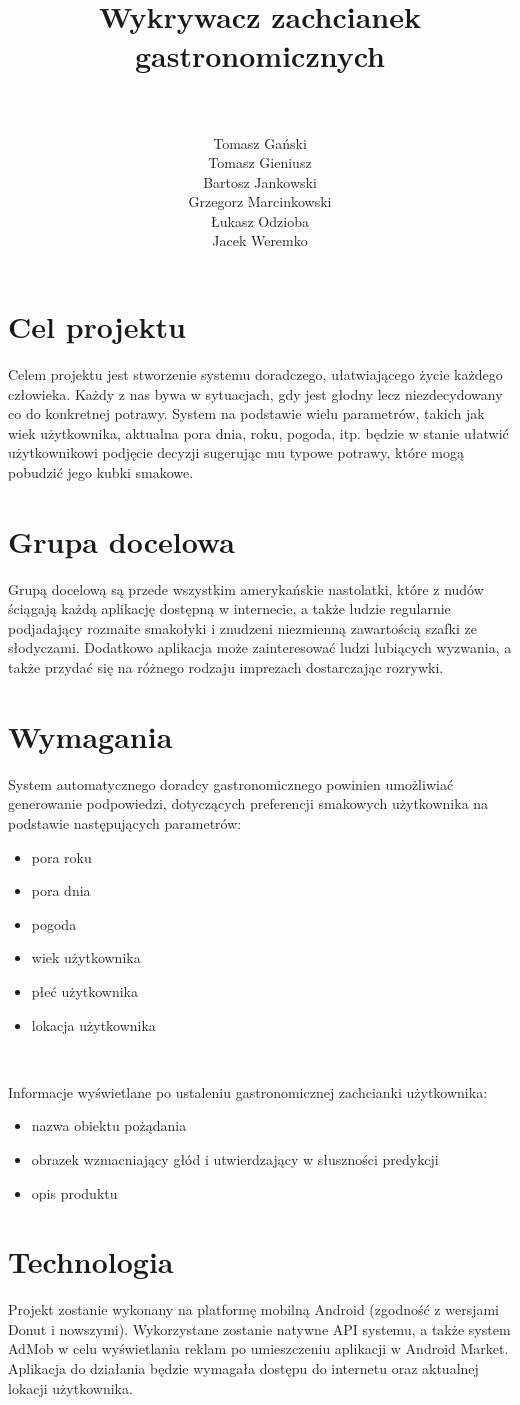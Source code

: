 \documentclass[a4paper,twoside,11pt]{article}
\author{\\ ~ \\ Tomasz Gański \\
Tomasz Gieniusz \\
Bartosz Jankowski\\
Grzegorz Marcinkowski\\
Łukasz Odzioba\\
Jacek Weremko}
\title{\LARGE Wykrywacz zachcianek gastronomicznych}
\begin{document}


\tableofcontents

\newpage

\section{Cel projektu}
Celem projektu jest stworzenie systemu doradczego, ułatwiającego życie każdego człowieka. Każdy z nas bywa w sytuacjach, gdy jest głodny lecz niezdecydowany co do konkretnej potrawy. 
System na podstawie wielu parametrów, takich jak wiek użytkownika, aktualna pora dnia, roku, pogoda, itp. będzie w stanie ułatwić użytkownikowi podjęcie decyzji sugerując mu typowe potrawy, które mogą pobudzić jego kubki smakowe.

\section{Grupa docelowa}
Grupą docelową są przede wszystkim amerykańskie nastolatki, które z nudów ściągają każdą aplikację dostępną w internecie, a także ludzie regularnie podjadający rozmaite smakołyki i znudzeni niezmienną zawartością szafki ze słodyczami. Dodatkowo aplikacja może zainteresować ludzi lubiących wyzwania, a także przydać się na różnego rodzaju imprezach dostarczając rozrywki.

\section{Wymagania}
System automatycznego doradcy gastronomicznego powinien umożliwiać generowanie podpowiedzi, dotyczących preferencji smakowych użytkownika na podstawie następujących parametrów:
\begin{itemize}
\item pora roku
\item pora dnia
\item pogoda
\item wiek użytkownika
\item płeć użytkownika
\item lokacja użytkownika
\end{itemize}
~ 

Informacje wyświetlane po ustaleniu gastronomicznej zachcianki użytkownika:
\begin{itemize}
\item nazwa obiektu pożądania
\item obrazek wzmacniający głód i utwierdzający w słuszności predykcji
\item opis produktu
\end{itemize}


\section{Technologia}
Projekt zostanie wykonany na platformę mobilną Android (zgodność z wersjami Donut i nowszymi). Wykorzystane zostanie natywne API systemu, a także system AdMob w celu wyświetlania reklam po umieszczeniu aplikacji w Android Market. Aplikacja do działania będzie wymagała dostępu do internetu oraz aktualnej lokacji użytkownika.
\end{document}

